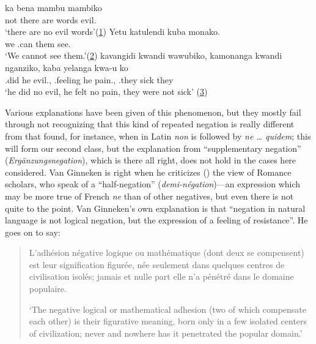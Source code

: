 \ea \label{ex:07-34}
\ea 
\gll ka bena mambu mambiko\\
 not {there are} words evil.\NEG{}\\
\glt `there are no evil words'\hfill(\href{https://archive.org/details/mosaichistoryan00guingoog/page/n12/mode/2up?view=theater&q=ka+bena}{1})
\ex 
\gll Yetu katulendi kuba monako.\\
 we \NEG{}.can them see.\NEG{}\\
\glt `We cannot see them.'\hfill(\href{https://archive.org/details/mosaichistoryan00guingoog/page/n14/mode/2up?view=theater&q=katulendi+kuba}{2})
\ex 
\gll kavangidi kwandi wawubiko, kamonanga kwandi nganziko, kaba yelanga kwa-u ko\\
 \NEG{}.did he evil.\NEG{}, \NEG{}.feeling he pain.\NEG{}, \NEG{}.they sick they \NEG{}\\
\glt `he did no evil, he felt no pain, they were not sick'
\hfill(\href{https://archive.org/details/mosaichistoryan00guingoog/page/n14/mode/2up?view=theater&q=kavangidi+kwandi}{3})
\z
\z{}

Various explanations have been given of this phenomenon, but they mostly fail through not recognizing that this kind of repeated negation is really different from that found, for instance, when in Latin \textit{non} is followed by \textit{ne {\dots} quidem}; this will form our second class, but the explanation from ``supplementary negation'' (\textit{Ergänzungsnegation}), which is there all right, does not hold in the cases here considered. Van Ginneken is right when he criticizes (\citeyear[\href{https://archive.org/details/principesdelingu00ginn/page/200/mode/2up?view=theater\&q=\%22Les\%20romanistes\%20ont\%20mis\%20en\%20usage\%22}{200}]{vanginneken1907principes}) the view of Romance scholars, who speak of a ``half-negation'' (\textit{demi-négation})---an expression which may be more true of French \textit{ne} than of other negatives, but even there is not quite to the point. Van Ginneken's own explanation is that ``negation in natural language is not logical negation, but the expression of a feeling of resistance''. He goes on to say:

\begin{quote}
L'adhésion négative logique ou mathématique (dont deux se compensent) est leur signification figurée, née seulement dans quelques centres de civilisation isolés; jamais et nulle part elle n'a pénétré dans le domaine populaire. %

`The negative logical or mathematical adhesion (two of which compensate each other) is their figurative meaning, born only in a few isolated centers of civilization; never and nowhere has it penetrated the popular domain.' 
\end{quote}

